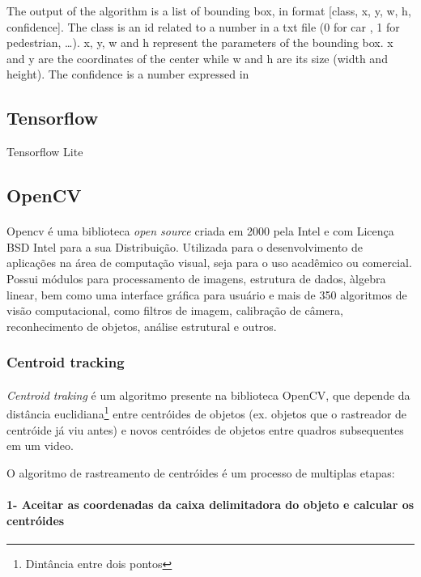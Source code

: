 The output of the algorithm is a list of bounding box, in format [class, x, y, w, h, confidence]. The class is an id related to a number in a txt file (0 for car , 1 for pedestrian, …). x, y, w and h represent the parameters of the bounding box. x and y are the coordinates of the center while w and h are its size (width and height). The confidence is a number expressed in %

\subsection{Tensorflow}
\label{chap2:subsec:tensorflow}

Tensorflow Lite


\subsection{OpenCV}
\label{chap2:subsec:opencv}
\paragraph{}

Opencv é uma biblioteca \textit{open source} criada em 2000 pela Intel e com Licença BSD Intel para a sua Distribuição. Utilizada para o desenvolvimento de aplicações na área de computação visual, seja para o uso acadêmico ou comercial. Possui módulos para processamento de imagens, estrutura de dados, àlgebra linear, bem como uma interface gráfica para usuário e mais de 350 algoritmos de visão computacional, como filtros de imagem, calibração de câmera, reconhecimento de objetos, análise estrutural e outros.


\subsubsection{Centroid tracking}

\paragraph{}
\textit{Centroid traking} é um algoritmo presente na biblioteca OpenCV, que depende da distância euclidiana\footnote{Dintância entre dois pontos} entre centróides de objetos (ex. objetos que o rastreador de centróide já viu antes) e novos centróides de objetos entre quadros subsequentes em um video.

O algoritmo de rastreamento de centróides é um processo de multiplas etapas:

\paragraph{1- Aceitar as coordenadas da caixa delimitadora do objeto e calcular os centróides}
